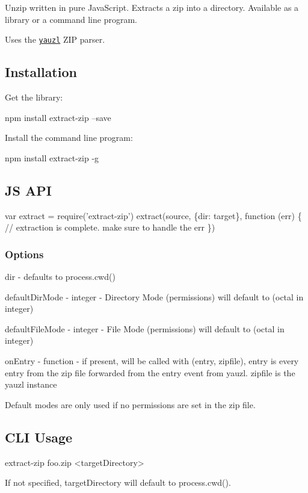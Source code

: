 Unzip written in pure Java\+Script. Extracts a zip into a directory. Available as a library or a command line program.

Uses the \href{http://npmjs.org/yauzl}{\tt {\ttfamily yauzl}} Z\+IP parser.

\href{https://nodei.co/npm/extract-zip/}{\tt } \href{https://github.com/feross/standard}{\tt } \href{https://travis-ci.org/maxogden/extract-zip}{\tt }

\subsection*{Installation}

Get the library\+:


\begin{DoxyCode}
npm install extract-zip --save
\end{DoxyCode}


Install the command line program\+:


\begin{DoxyCode}
npm install extract-zip -g
\end{DoxyCode}


\subsection*{JS A\+PI}


\begin{DoxyCode}
var extract = require('extract-zip')
extract(source, \{dir: target\}, function (err) \{
 // extraction is complete. make sure to handle the err
\})
\end{DoxyCode}


\subsubsection*{Options}


\begin{DoxyItemize}
\item {\ttfamily dir} -\/ defaults to {\ttfamily process.\+cwd()}
\item {\ttfamily default\+Dir\+Mode} -\/ integer -\/ Directory Mode (permissions) will default to {} (octal {} in integer)
\item {\ttfamily default\+File\+Mode} -\/ integer -\/ File Mode (permissions) will default to {} (octal {} in integer)
\item {\ttfamily on\+Entry} -\/ function -\/ if present, will be called with {\ttfamily (entry, zipfile)}, entry is every entry from the zip file forwarded from the {\ttfamily entry} event from yauzl. {\ttfamily zipfile} is the {\ttfamily yauzl} instance
\end{DoxyItemize}

Default modes are only used if no permissions are set in the zip file.

\subsection*{C\+LI Usage}


\begin{DoxyCode}
extract-zip foo.zip <targetDirectory>
\end{DoxyCode}


If not specified, {\ttfamily target\+Directory} will default to {\ttfamily process.\+cwd()}. 